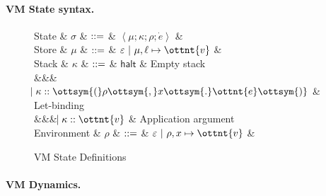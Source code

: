 \paragraph{VM State syntax.}

\begin{figure}
  \begin{grammar}
    State
    & $\sigma$ & $\mathrel{::=}$ & $ \left<  \mu ;  \kappa ;  \rho ;  \dot{e}  \right> $ & 
    \\
    Store
    & $\mu$ & $\mathrel{::=}$ & $\varepsilon~|~ \mu  ,  \ell \mapsto \ottnt{v} $ &
    \\
    Stack
    & $\kappa$ & $\mathrel{::=}$ & $ \textsf{halt} $ & Empty stack
    \\
    &&& $\bnfaltbrk \kappa  ::  \ottsym{(}  \rho  \ottsym{,}  x  \ottsym{.}  \ottnt{e}  \ottsym{)}$ & Let-binding
    \\
    &&& $\bnfaltbrk \kappa  ::  \ottnt{v}$ & Application argument
    \\
    Environment
    & $\rho$   & $\mathrel{::=}$ & $\varepsilon~|~ \rho  ,  x \mapsto \ottnt{v} $ & 
  \end{grammar}
  \caption{VM State Definitions}
\end{figure}


\paragraph{VM Dynamics.}


